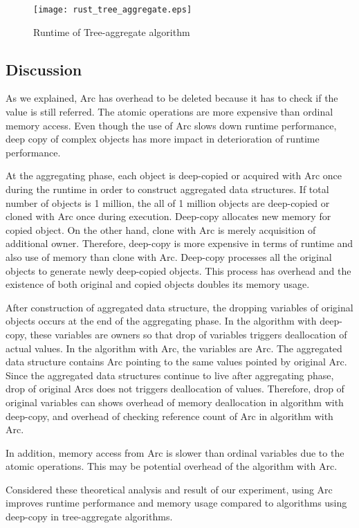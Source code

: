 \begin{figure}[htb]
    \texttt{[image: rust\_tree\_aggregate.eps]}
    \caption{Runtime of Tree-aggregate algorithm}
    \label{fig:ex_tree_agg}
\end{figure}

\subsection{Discussion}
As we explained, Arc has overhead to be deleted because it has to check if the value is still referred. The atomic operations are more expensive than ordinal memory access.
Even though the use of Arc slows down runtime performance, deep copy of complex objects has more impact in deterioration of runtime performance. 

At the aggregating phase, each object is deep-copied or acquired with Arc once during the runtime in order to construct aggregated data structures.
If total number of objects is 1 million, the all of 1 million objects are deep-copied or cloned with Arc once during execution. 
Deep-copy allocates new memory for copied object. On the other hand, clone with Arc is merely acquisition of additional owner. 
Therefore, deep-copy is more expensive in terms of runtime and also use of memory than clone with Arc. 
Deep-copy processes all the original objects to generate newly deep-copied objects. 
This process has overhead and the existence of both original and copied objects doubles its memory usage.

After construction of aggregated data structure, the dropping variables of original objects occurs at the end of the aggregating phase.
In the algorithm with deep-copy, these variables are owners so that drop of variables triggers deallocation of actual values.
In the algorithm with Arc, the variables are Arc. The aggregated data structure contains Arc pointing to the same values pointed by original Arc.
Since the aggregated data structures continue to live after aggregating phase, drop of original Arcs does not triggers deallocation of values. 
Therefore, drop of original variables can shows overhead of memory deallocation in algorithm with deep-copy, 
and overhead of checking reference count of Arc in algorithm with Arc.

In addition, memory access from Arc is slower than ordinal variables due to the atomic operations. This may be potential overhead of the algorithm with Arc.

Considered these theoretical analysis and result of our experiment, using Arc improves runtime performance and memory usage compared to algorithms using deep-copy in tree-aggregate algorithms.